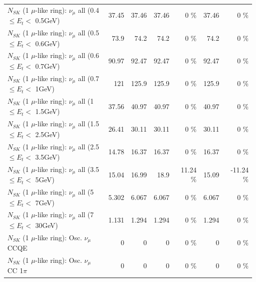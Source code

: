 \begin{table}
\begin{tabular}{| l | r | r | r  r | r  r |}
       $N_{SK}$ (1 $\mu$-like ring): $\nu_{\mu}$ all (0.4 $\leq E_{t} <$ 0.5GeV) &           37.45 &           37.46 &           37.46 &        0 \%  &           37.46 &        0 \%  \\ 
       $N_{SK}$ (1 $\mu$-like ring): $\nu_{\mu}$ all (0.5 $\leq E_{t} <$ 0.6GeV) &            73.9 &            74.2 &            74.2 &        0 \%  &            74.2 &        0 \%  \\ 
       $N_{SK}$ (1 $\mu$-like ring): $\nu_{\mu}$ all (0.6 $\leq E_{t} <$ 0.7GeV) &           90.97 &           92.47 &           92.47 &        0 \%  &           92.47 &        0 \%  \\ 
         $N_{SK}$ (1 $\mu$-like ring): $\nu_{\mu}$ all (0.7 $\leq E_{t} <$ 1GeV) &             121 &           125.9 &           125.9 &        0 \%  &           125.9 &        0 \%  \\ 
         $N_{SK}$ (1 $\mu$-like ring): $\nu_{\mu}$ all (1 $\leq E_{t} <$ 1.5GeV) &           37.56 &           40.97 &           40.97 &        0 \%  &           40.97 &        0 \%  \\ 
       $N_{SK}$ (1 $\mu$-like ring): $\nu_{\mu}$ all (1.5 $\leq E_{t} <$ 2.5GeV) &           26.41 &           30.11 &           30.11 &        0 \%  &           30.11 &        0 \%  \\ 
       $N_{SK}$ (1 $\mu$-like ring): $\nu_{\mu}$ all (2.5 $\leq E_{t} <$ 3.5GeV) &           14.78 &           16.37 &           16.37 &        0 \%  &           16.37 &        0 \%  \\ 
         $N_{SK}$ (1 $\mu$-like ring): $\nu_{\mu}$ all (3.5 $\leq E_{t} <$ 5GeV) &           15.04 &           16.99 &            18.9 &    11.24 \%  &           15.09 &   -11.24 \%  \\ 
           $N_{SK}$ (1 $\mu$-like ring): $\nu_{\mu}$ all (5 $\leq E_{t} <$ 7GeV) &           5.302 &           6.067 &           6.067 &        0 \%  &           6.067 &        0 \%  \\ 
          $N_{SK}$ (1 $\mu$-like ring): $\nu_{\mu}$ all (7 $\leq E_{t} <$ 30GeV) &           1.131 &           1.294 &           1.294 &        0 \%  &           1.294 &        0 \%  \\ 
\hline
\hline
                               $N_{SK}$ (1 $\mu$-like ring): Osc. $\nu_\mu$ CCQE &               0 &               0 &               0 &        0 \%  &               0 &        0 \%  \\ 
                          $N_{SK}$ (1 $\mu$-like ring): Osc. $\nu_\mu$ CC 1$\pi$ &               0 &               0 &               0 &        0 \%  &               0 &        0 \%  \\ 

\end{tabular}
\end{table}
